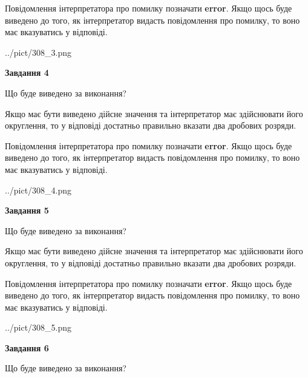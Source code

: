 \documentclass[12pt, ukrainian]{article}
\begin{document}
{\begin {Large}
Повідомлення інтерпретатора про помилку позначати \textbf{error}.
Якщо щось буде виведено до того, як інтерпретатор видасть повідомлення про помилку, 
то воно має вказуватись у відповіді. \par

\begin{center}
	{../pict/308_3.png}
\end{center}
\newpage

{\begin {center}\textbf{Завдання 4}\end {center}}\par
Що буде виведено за виконання? \par

Якщо має бути виведено дійсне значення та інтерпретатор має здійснювати його округлення, 
то у відповіді достатньо правильно вказати два дробових розряди.

Повідомлення інтерпретатора про помилку позначати \textbf{error}.
Якщо щось буде виведено до того, як інтерпретатор видасть повідомлення про помилку, 
то воно має вказуватись у відповіді. \par

\begin{center}
	{../pict/308_4.png}
\end{center}
\newpage

{\begin {center}\textbf{Завдання 5}\end {center}}\par
Що буде виведено за виконання? \par

Якщо має бути виведено дійсне значення та інтерпретатор має здійснювати його округлення, 
то у відповіді достатньо правильно вказати два дробових розряди.

Повідомлення інтерпретатора про помилку позначати \textbf{error}.
Якщо щось буде виведено до того, як інтерпретатор видасть повідомлення про помилку, 
то воно має вказуватись у відповіді. \par

\begin{center}
	{../pict/308_5.png}
\end{center}
\newpage

{\begin {center}\textbf{Завдання 6}\end {center}}\par
Що буде виведено за виконання? \par


\end{Large}}
\end{document}
